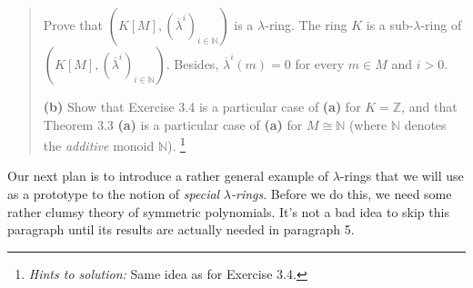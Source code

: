 \documentclass[12pt,final,notitlepage,onecolumn,german]{article}%
\begin{document}
\begin{quotation}
Prove that $\left(  K\left[  M\right]  ,\left(  \overline{\lambda}^{i}\right)
_{i\in\mathbb{N}}\right)  $ is a $\lambda$-ring. The ring $K$ is a
sub-$\lambda$-ring of $\left(  K\left[  M\right]  ,\left(  \overline{\lambda
}^{i}\right)  _{i\in\mathbb{N}}\right)  $. Besides, $\overline{\lambda}%
^{i}\left(  m\right)  =0$ for every $m\in M$ and $i>0$.

\textbf{(b)} Show that Exercise 3.4 is a particular case of \textbf{(a)} for
$K=\mathbb{Z}$, and that Theorem 3.3 \textbf{(a)} is a particular case of
\textbf{(a)} for $M\cong\mathbb{N}$ (where $\mathbb{N}$ denotes the
\textit{additive} monoid $\mathbb{N}$). \footnote{\textit{Hints to solution:}
Same idea as for Exercise 3.4.}
\end{quotation}

\begin{center}
\end{center}

Our next plan is to introduce a rather general example of $\lambda$-rings that
we will use as a prototype to the notion of \textit{special }$\lambda
$\textit{-rings}. Before we do this, we need some rather clumsy theory of
symmetric polynomials. It's not a bad idea to skip this paragraph until its
results are actually needed in paragraph 5.
\end{document}

